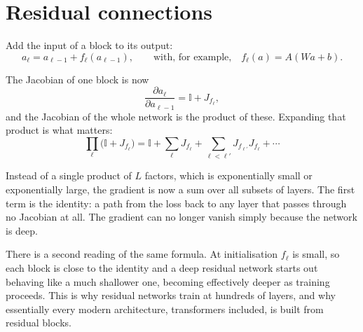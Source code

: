 \documentclass[11pt]{article}
\begin{document}
\section{Residual connections}

Add the input of a block to its output:
%
\[
  a_\ell = a_{\ell-1} + f_\ell(a_{\ell-1}),
  \qquad\text{with, for example,}\quad
  f_\ell(a) = A(W a + b).
\]

\begin{center}
\end{center}

\noindent
The Jacobian of one block is now
%
\[
  \frac{\partial a_\ell}{\partial a_{\ell-1}} = \mathbb{I} + J_{f_\ell},
\]
%
and the Jacobian of the whole network is the product of these. Expanding that product is
what matters:
%
\[
  \prod_\ell \big(\mathbb{I} + J_{f_\ell}\big)
  = \mathbb{I}
  + \sum_\ell J_{f_\ell}
  + \sum_{\ell < \ell'} J_{f_{\ell'}} J_{f_\ell}
  + \cdots
\]

\begin{keybox}
Instead of a single product of $L$ factors, which is exponentially small or exponentially
large, the gradient is now a sum over all subsets of layers. The first term is the
identity: a path from the loss back to any layer that passes through no Jacobian at all.
The gradient can no longer vanish simply because the network is deep.
\end{keybox}

\noindent
There is a second reading of the same formula. At initialisation $f_\ell$ is small, so each
block is close to the identity and a deep residual network starts out behaving like a much
shallower one, becoming effectively deeper as training proceeds. This is why residual
networks train at hundreds of layers, and why essentially every modern architecture,
transformers included, is built from residual blocks.
\end{document}
